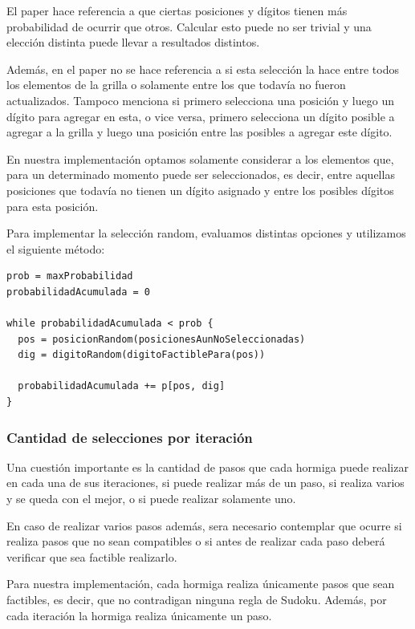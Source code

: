 \documentclass[a4paper,spanish]{article}
\begin{document}
El paper\cite{ant_colony} hace referencia a que ciertas posiciones y dígitos tienen más probabilidad de ocurrir que
otros. Calcular esto puede no ser trivial y una elección distinta puede llevar a resultados distintos.

Además, en el paper no se hace referencia a si esta selección la hace entre todos los elementos de
la grilla o solamente entre los que todavía no fueron actualizados. Tampoco menciona si primero
selecciona una posición y luego un dígito para agregar en esta, o vice versa, primero selecciona un
dígito posible a agregar a la grilla y luego una posición entre las posibles a agregar este dígito.

En nuestra implementación optamos solamente considerar a los elementos que, para un determinado
momento puede ser seleccionados, es decir, entre aquellas posiciones que todavía no tienen un dígito
asignado y entre los posibles dígitos para esta posición.

Para implementar la selección random, evaluamos distintas opciones y utilizamos el siguiente método:


\begin{Verbatim}[samepage=true]
prob = maxProbabilidad
probabilidadAcumulada = 0

while probabilidadAcumulada < prob {
  pos = posicionRandom(posicionesAunNoSeleccionadas)
  dig = digitoRandom(digitoFactiblePara(pos))

  probabilidadAcumulada += p[pos, dig]
}
\end{Verbatim}

\subsubsection{Cantidad de selecciones por iteración}

Una cuestión importante es la cantidad de pasos que cada hormiga puede realizar en cada una de sus
iteraciones, si puede realizar más de un paso, si realiza varios y se queda con el mejor, o si
puede realizar solamente uno.

En caso de realizar varios pasos además, sera necesario contemplar que ocurre si realiza pasos que
no sean compatibles o si antes de realizar cada paso deberá verificar que sea factible realizarlo.

Para nuestra implementación, cada hormiga realiza únicamente pasos que sean factibles, es decir, que no
contradigan ninguna regla de Sudoku. Además, por cada iteración la hormiga realiza únicamente un paso.
\end{document}
